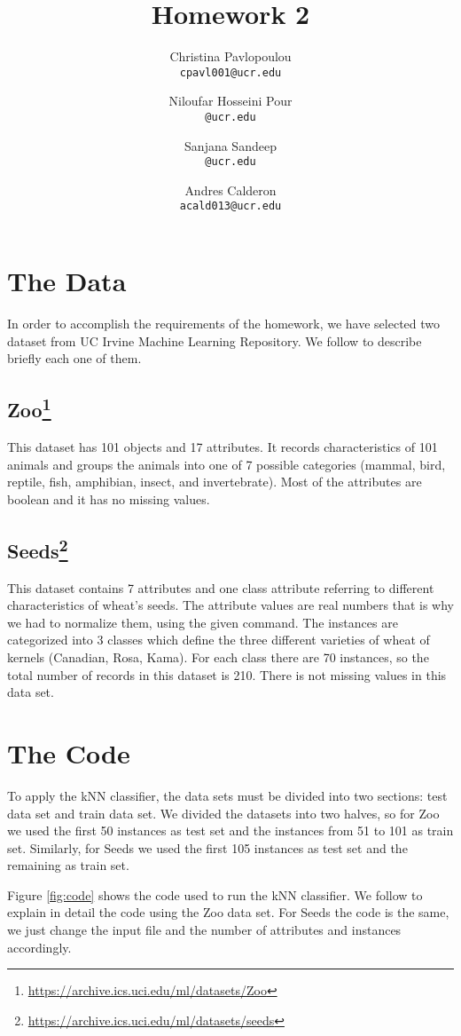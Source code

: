 \documentclass[10pt]{scrartcl}
\title{Homework 2}
\author{
   Christina Pavlopoulou\\
  \small \texttt{cpavl001@ucr.edu}
  \and
   Niloufar Hosseini Pour\\
  \small \texttt{@ucr.edu}
  \and
   Sanjana Sandeep \\
  \small \texttt{@ucr.edu}
  \and
   Andres Calderon\\
  \small \texttt{acald013@ucr.edu}
}
\begin{document}
\tiny
\maketitle
\normalsize

\section{The Data}
In order to accomplish the requirements of the homework, we have selected two dataset from UC Irvine Machine Learning Repository\cite{repo}.  We follow to describe briefly each one of them.

\subsection[Zoo]{Zoo\footnote{\url{https://archive.ics.uci.edu/ml/datasets/Zoo}}}
This dataset has 101 objects and 17 attributes. It records characteristics of 101 animals and groups the animals into one of 7 possible categories (mammal, bird, reptile, fish,
amphibian, insect, and invertebrate). Most of the attributes are boolean and it has no missing values.

\subsection[Seeds]{Seeds\footnote{\url{https://archive.ics.uci.edu/ml/datasets/seeds}}}
This dataset contains 7 attributes and one class attribute referring to different characteristics of wheat's seeds.  The attribute values are real numbers that is why we had to normalize them, using the given command. The instances are categorized into 3 classes which define the three different varieties of wheat of kernels (Canadian, Rosa, Kama). For each class there are 70 instances, so the total number of records in this dataset is 210. There is not missing values in this data set.

\section{The Code}
To apply the kNN classifier, the data sets must be divided into two sections: test data set and train data set.  We divided the datasets into two halves, so for Zoo we used the first 50 instances as test set and the instances from 51 to 101 as train set.  Similarly, for Seeds we used the first 105 instances as test set and the remaining as train set.  

Figure \ref{fig:code} shows the code used to run the kNN classifier.  We follow to explain in detail the code using the Zoo data set.  For Seeds the code is the same, we just change the input file and the number of attributes and instances accordingly.
\end{document}

